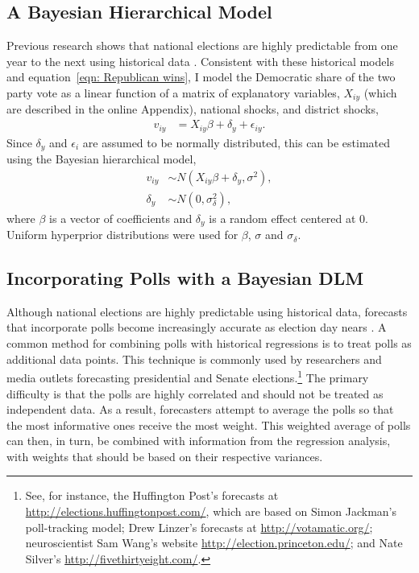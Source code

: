 \documentclass[12pt,final,fleqn]{article}
\theoremstyle{plain}
\begin{document}
\subsection{A Bayesian Hierarchical Model}
Previous research shows that national elections are highly predictable from one year to the next using historical data \citep[e.g.][]{campbell1992forecasting, gelman1993american, kastellec2008predicting}. Consistent with these historical models and equation~\ref{eqn: Republican wins}, I model the Democratic share of the two party vote as a linear function of a matrix of explanatory variables, $X_{iy}$ (which are described in the online Appendix), national shocks, and district shocks,
\begin{align}
v_{iy}&= X_{iy}\beta + \delta_y + \epsilon_{iy}.
\end{align}
Since $\delta_y$ and $\epsilon_i$ are assumed to be normally distributed, this can be estimated using the Bayesian hierarchical model,
\begin{align}
v_{iy} &\sim N\left(X_{iy}\beta + \delta_y,  \sigma^2\right), \label{eqn: hierarchical linear model} \\
\delta_y &\sim N(0, \sigma^2_\delta), \label{eqn: hierarchical linear model time effects}
\end{align}
where $\beta$ is a vector of coefficients and $\delta_y$ is a random effect centered at 0. Uniform hyperprior distributions were used for $\beta$, $\sigma$ and $\sigma_\delta$.

\subsection{Incorporating Polls with a Bayesian DLM}
Although national elections are highly predictable using historical data, forecasts that incorporate polls become increasingly accurate as election day nears \citet{linzer2013dynamic}. A common method for combining polls with historical regressions is to treat polls as additional data points. This technique is commonly used by researchers and media outlets forecasting presidential and Senate elections.\footnote{See, for instance, the Huffington Post's forecasts at \url{http://elections.huffingtonpost.com/}, which are based on Simon Jackman's poll-tracking model; Drew Linzer's forecasts at \url{http://votamatic.org/}; neuroscientist Sam Wang's website \url{http://election.princeton.edu/}; and Nate Silver's \url{http://fivethirtyeight.com/}.} The primary difficulty is that the polls are highly correlated and should not be treated as independent data. As a result, forecasters attempt to average the polls so that the most informative ones receive the most weight. This weighted average of polls can then, in turn, be combined with information from the regression analysis, with weights that should be based on their respective variances.
\end{document}
